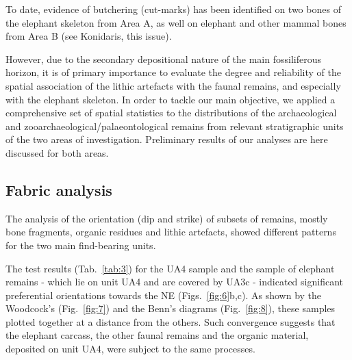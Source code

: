 \documentclass[preprint,authoryear,times]{elsarticle} %
\begin{document}
To date, evidence of butchering (cut-marks) has been identified on two bones of the elephant skeleton from Area A, as well on elephant and other mammal bones from Area B (see Konidaris, this issue).

However, due to the secondary depositional nature of the main fossiliferous horizon, it is of primary importance to evaluate the degree and reliability of the spatial association of the lithic artefacts with the faunal remains, and especially with the elephant skeleton. In order to tackle our main objective, we applied a comprehensive set of spatial statistics to the distributions of the archaeological and zooarchaeological/palaeontological remains from relevant stratigraphic units of the two areas of investigation. Preliminary results of our analyses are here discussed for both areas.

\subsection{Fabric analysis}



The analysis of the orientation (dip and strike) of subsets of remains, mostly bone fragments, organic residues and lithic artefacts, showed different patterns for the two main find-bearing units.


The test results (Tab.~\ref{tab:3}) for the UA4 sample and the sample of elephant remains - which lie on unit UA4 and are covered by UA3c - indicated significant preferential orientations towards the NE (Figs.~\ref{fig:6}b,c). As shown by the Woodcock's (Fig.~\ref{fig:7}) and the Benn's diagrams (Fig.~\ref{fig:8}), these samples plotted together at a distance from the others. Such convergence suggests that the elephant carcass, the other faunal remains and the organic material, deposited on unit UA4, were subject to the same processes.
\end{document}
